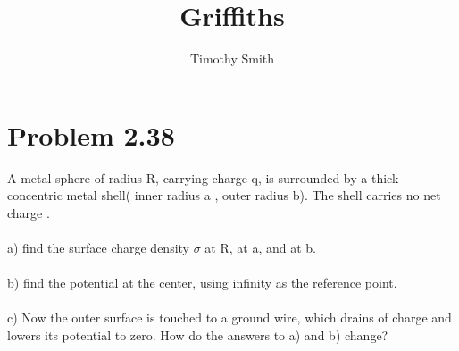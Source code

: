\documentclass{article}
\begin{document}
\author{Timothy Smith}
\title{Griffiths}
\maketitle

\section*{Problem 2.38}
A metal sphere of radius R, carrying charge q, is surrounded by a thick concentric metal shell( inner radius a , outer radius b).  The shell carries no net charge .
\\
\\
a) find the surface charge density $\sigma$ at R, at a, and  at b.
\\
\\
b) find the potential at the center, using infinity as the reference point.
\\
\\
c) Now the outer surface is touched to a ground wire, which drains of charge and lowers its potential to zero.  How do the answers to a) and b) change?
\\
\begin{center}
\end{center}
\end{document}
